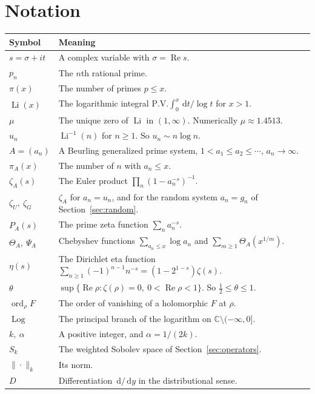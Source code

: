 \documentclass[12pt,letterpaper]{article}
\theoremstyle{definition}
\theoremstyle{remark}
\newcommand{\Li}{\operatorname{Li}}
\newcommand{\Log}{\operatorname{Log}}
\newcommand{\Ree}{\operatorname{Re}}
\newcommand{\dd}{\,\mathrm{d}}
\newcommand{\CC}{\mathbb{C}}
\newcommand{\ord}{\operatorname{ord}}
\begin{document}
\section{Notation}\label{sec:notation}

\begin{longtable}{@{}p{}p{}@{}}
\toprule
\textbf{Symbol} & \textbf{Meaning}\\
\midrule
\endhead
$s=\sigma+it$ & A complex variable with $\sigma=\Ree s$.\\
$p_n$ & The $n$th rational prime.\\
$\pi(x)$ & The number of primes $p\le x$.\\
$\Li(x)$ & The logarithmic integral $\mathrm{P.V.}\int_0^x \dd t/\log t$ for
$x>1$.\\
$\mu$ & The unique zero of $\Li$ in $(1,\infty)$. Numerically
$\mu\approx 1.4513$.\\
$u_n$ & $\Li^{-1}(n)$ for $n\ge1$. So $u_n\sim n\log n$.\\
$A=(a_n)$ & A Beurling generalized prime system, $1<a_1\le a_2\le\cdots$,
$a_n\to\infty$.\\
$\pi_A(x)$ & The number of $n$ with $a_n\le x$.\\
$\zeta_A(s)$ & The Euler product $\prod_n(1-a_n^{-s})^{-1}$.\\
$\zeta_U,\ \zeta_G$ & $\zeta_A$ for $a_n=u_n$, and for the random system
$a_n=g_n$ of Section~\ref{sec:random}.\\
$P_A(s)$ & The prime zeta function $\sum_n a_n^{-s}$.\\
$\Theta_A,\ \Psi_A$ & Chebyshev functions $\sum_{a_n\le x}\log a_n$ and
$\sum_{m\ge1}\Theta_A(x^{1/m})$.\\
$\eta(s)$ & The Dirichlet eta function
$\sum_{n\ge1}(-1)^{n-1}n^{-s}=(1-2^{1-s})\zeta(s)$.\\
$\theta$ & $\sup\{\Ree\rho:\zeta(\rho)=0,\ 0<\Ree\rho<1\}$. So
$\tfrac12\le\theta\le1$.\\
$\ord_\rho F$ & The order of vanishing of a holomorphic $F$ at $\rho$.\\
$\Log$ & The principal branch of the logarithm on
$\CC\setminus(-\infty,0]$.\\
$k,\ \alpha$ & A positive integer, and $\alpha=1/(2k)$.\\
$S_k$ & The weighted Sobolev space of Section~\ref{sec:operators}.\\
$\|\cdot\|_k$ & Its norm.\\
$D$ & Differentiation $\dd/\dd y$ in the distributional sense.\\

\end{longtable}
\end{document}
